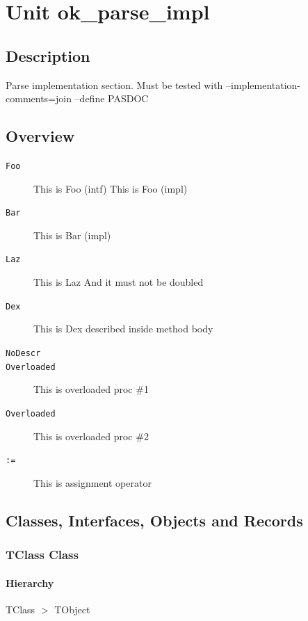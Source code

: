 \documentclass{report}
\begin{document}
\newlength{\tmplength}
\chapter{Unit ok{\_}parse{\_}impl}
\section{Description}
Parse implementation section. Must be tested with --implementation{-}comments=join --define PASDOC
\section{Overview}
\begin{description}
\item[\texttt{\begin{ttfamily}TClass\end{ttfamily} Class}]
\item[\texttt{\begin{ttfamily}TMyType\end{ttfamily} Record}]
\end{description}
\begin{description}
\item[\texttt{Foo}]This is Foo (intf) This is Foo (impl)
\item[\texttt{Bar}]This is Bar (impl)
\item[\texttt{Laz}]This is Laz And it must not be doubled
\item[\texttt{Dex}]This is Dex described inside method body
\item[\texttt{NoDescr}]
\item[\texttt{Overloaded}]This is overloaded proc {\#}1
\item[\texttt{Overloaded}]This is overloaded proc {\#}2
\item[\texttt{:=}]This is assignment operator
\end{description}
\section{Classes, Interfaces, Objects and Records}
\subsection*{TClass Class}
\subsubsection*{\large{\textbf{Hierarchy}}\normalsize\hspace{1ex}\hfill}
TClass {$>$} TObject
\end{document}
